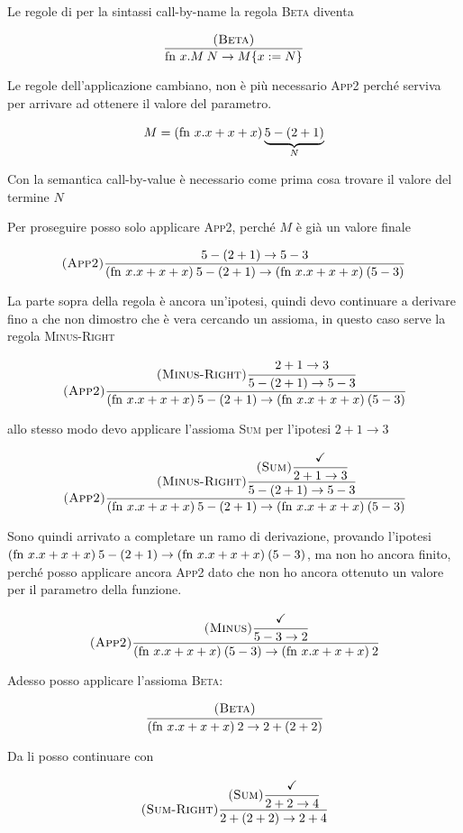 Le regole di per la sintassi call-by-name la regola \textsc{Beta} diventa

$$
\frac{\textsc{(Beta)}}{\text{fn }x.M \: N \rightarrow M \{ x := N\}}
$$

Le regole dell'applicazione cambiano, non è più necessario \textsc{App2} perché serviva per arrivare ad ottenere il valore del parametro.

$$
	M = (\text{fn } x. x+x+x) \underbrace{5-(2+1)}_{N}
$$	

Con la semantica call-by-value è necessario come prima cosa trovare il valore del termine $N$

Per proseguire posso solo applicare \textsc{App2}, perché $M$ è già un valore finale

$$
\textsc{(App2)}\frac{5-(2+1) \rightarrow 5 -3}{(\text{fn } x.x+x+x) \: 5-(2+1) \rightarrow (\text{fn } x.x+x+x)\: (5-3)}
$$

La parte sopra della regola è ancora un'ipotesi, quindi devo continuare a derivare fino a che non dimostro che è vera cercando un assioma, in questo caso serve la regola \textsc{Minus-Right}	

$$
\textsc{(App2)} 
\cfrac{
	\textsc{(Minus-Right)}
	\cfrac{
		2+1 \rightarrow 3
	}{
		5-(2+1) \rightarrow 5 -3
	}
}{
	(\text{fn } x.x+x+x) \: 5-(2+1) \rightarrow (\text{fn } x.x+x+x)\: (5-3)
}
$$

allo stesso modo devo applicare l'assioma \textsc{Sum} per l'ipotesi $2+1\rightarrow3$

$$
\textsc{(App2)} 
\cfrac{
	\textsc{(Minus-Right)}
	\cfrac{
		\textsc{(Sum)}
		\cfrac{
			\checkmark
		}{
			2+1 \rightarrow 3
		}
	}{
		5-(2+1) \rightarrow 5 -3
	}
}{
	(\text{fn } x.x+x+x) \: 5-(2+1) \rightarrow (\text{fn } x.x+x+x)\: (5-3)
}
$$

Sono quindi arrivato a completare un ramo di derivazione, provando l'ipotesi $(\text{fn } x. x+x+x)\: 5-(2+1) \rightarrow (\text{fn } x.x+x+x)\: (5-3)$, ma non ho ancora finito, perché posso applicare ancora \textsc{App2} dato che non ho ancora ottenuto un valore per il parametro della funzione.

$$
\textsc{(App2)} 
\cfrac{
	\textsc{(Minus)}
	\cfrac{
		\checkmark
	}{
		5-3\rightarrow 2
	}
}{
	(\text{fn } x.x+x+x) \: (5-3) \rightarrow (\text{fn } x.x+x+x)\: 2
}
$$

Adesso posso applicare l'assioma \textsc{Beta}:

$$
\cfrac{\textsc{(Beta)}}{
	(\text{fn } x.x+x+x)\: 2 \rightarrow 2+(2+2)
}
$$

Da li posso continuare con

$$
\textsc{(Sum-Right)} 
\cfrac{
	\textsc{(Sum)}
	\cfrac{
		\checkmark
	}{
		2+2\rightarrow 4
	}
}{
	2+(2+2) \rightarrow 2+4
}
$$

